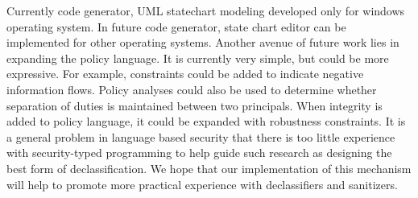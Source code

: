 Currently code generator, UML statechart modeling developed only for windows operating system. In future code generator, state chart editor can be implemented for other operating systems. Another avenue of future work lies in expanding the policy language. It is currently very simple, but could be more expressive. For example, constraints could be added to indicate negative information flows. Policy analyses could also be used to determine whether separation of duties is maintained between two principals. When integrity is added to policy language, it could be expanded with robustness constraints. It is a general problem in language based security that there is too little experience with security-typed programming to help guide such research as designing the best form of declassification. We hope that our implementation of this mechanism will help to promote more practical experience with declassifiers and sanitizers.



